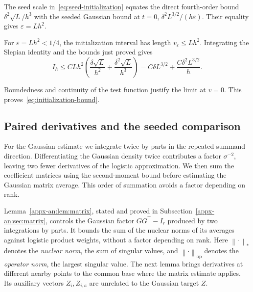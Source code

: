 \documentclass[11pt,letterpaper]{article}
\theoremstyle{remark}
\newcommand{\op}{\mathrm{op}}
\newcommand{\norm}[1]{\left\lVert#1\right\rVert}
\begin{document}
The seed scale in~\eqref{eq:seed-initialization} equates the direct
fourth-order bound \(\delta^2\sqrt L/h^3\) with the seeded Gaussian
bound at \(t=0\), \(\delta^2L^{3/2}/(h\varepsilon)\).
Their equality gives \(\varepsilon=Lh^2\).


For \(\varepsilon=Lh^2<1/4\), the initialization interval has length
\(v_\varepsilon\le Lh^2\). Integrating the Slepian identity and
the bounds just proved gives
\[
 I_h\le C Lh^2\left(\frac{\delta\sqrt L}{h^2}
                     +\frac{\delta^2\sqrt L}{h^3}\right)
      =C\delta L^{3/2}+\frac{C\delta^2L^{3/2}}h.
\]

Boundedness and continuity of the test function justify the limit
at \(v=0\). This proves~\eqref{eq:initialization-bound}.

\subsection{Paired derivatives and the seeded comparison}
\label{appx-an:sec:restoration}

For the Gaussian estimate we integrate twice by parts in the repeated
summand direction. Differentiating the Gaussian density twice contributes a factor
\(\sigma^{-2}\), leaving two fewer derivatives of the logistic
approximation. We then sum the coefficient matrices using the
second-moment bound before estimating the Gaussian matrix average.
This order of summation avoids a factor depending on rank.

Lemma~\ref{appx-an:lem:matrix}, stated and proved in
Subsection~\ref{appx-an:sec:matrix}, controls the Gaussian factor
\(GG^\top-I_r\) produced by two integrations by parts. It bounds
the sum of the nuclear norms of its averages against logistic product
weights, without a factor depending on rank. Here
\(\norm{\cdot}_*\) denotes the \emph{nuclear norm}, the sum of singular
values, and \(\norm{\cdot}_\op\) denotes the \emph{operator norm},
the largest singular value. The next lemma brings derivatives at
different nearby points to the common base where the matrix estimate
applies. Its auxiliary vectors \(Z_i,Z_{i,a}\) are unrelated to the
Gaussian target \(Z\).
\end{document}
